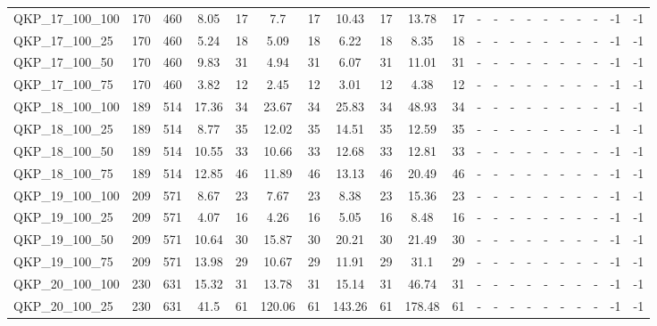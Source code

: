 \begin{sidewaystable}[!ht]
{\begin{tabular}{lcccccccccccccccccccc}
QKP\_17\_100\_100 & 170 & 460 & 8.05 & 17 &  \textcolor{blue2}{7.7} & 17 & 10.43 & 17 & 13.78 & 17 &  - &  - &  - &  - &  - &  - &  - &  - & -1 & -1 \\
QKP\_17\_100\_25 & 170 & 460 & 5.24 & 18 &  \textcolor{blue2}{5.09} & 18 & 6.22 & 18 & 8.35 & 18 &  - &  - &  - &  - &  - &  - &  - &  - & -1 & -1 \\
QKP\_17\_100\_50 & 170 & 460 & 9.83 & 31 &  \textcolor{blue2}{4.94} & 31 & 6.07 & 31 & 11.01 & 31 &  - &  - &  - &  - &  - &  - &  - &  - & -1 & -1 \\
QKP\_17\_100\_75 & 170 & 460 & 3.82 & 12 &  \textcolor{blue2}{2.45} & 12 & 3.01 & 12 & 4.38 & 12 &  - &  - &  - &  - &  - &  - &  - &  - & -1 & -1 \\
QKP\_18\_100\_100 & 189 & 514 &  \textcolor{blue2}{17.36} & 34 & 23.67 & 34 & 25.83 & 34 & 48.93 & 34 &  - &  - &  - &  - &  - &  - &  - &  - & -1 & -1 \\
QKP\_18\_100\_25 & 189 & 514 &  \textcolor{blue2}{8.77} & 35 & 12.02 & 35 & 14.51 & 35 & 12.59 & 35 &  - &  - &  - &  - &  - &  - &  - &  - & -1 & -1 \\
QKP\_18\_100\_50 & 189 & 514 &  \textcolor{blue2}{10.55} & 33 & 10.66 & 33 & 12.68 & 33 & 12.81 & 33 &  - &  - &  - &  - &  - &  - &  - &  - & -1 & -1 \\
QKP\_18\_100\_75 & 189 & 514 & 12.85 & 46 &  \textcolor{blue2}{11.89} & 46 & 13.13 & 46 & 20.49 & 46 &  - &  - &  - &  - &  - &  - &  - &  - & -1 & -1 \\
QKP\_19\_100\_100 & 209 & 571 & 8.67 & 23 &  \textcolor{blue2}{7.67} & 23 & 8.38 & 23 & 15.36 & 23 &  - &  - &  - &  - &  - &  - &  - &  - & -1 & -1 \\
QKP\_19\_100\_25 & 209 & 571 &  \textcolor{blue2}{4.07} & 16 & 4.26 & 16 & 5.05 & 16 & 8.48 & 16 &  - &  - &  - &  - &  - &  - &  - &  - & -1 & -1 \\
QKP\_19\_100\_50 & 209 & 571 &  \textcolor{blue2}{10.64} & 30 & 15.87 & 30 & 20.21 & 30 & 21.49 & 30 &  - &  - &  - &  - &  - &  - &  - &  - & -1 & -1 \\
QKP\_19\_100\_75 & 209 & 571 & 13.98 & 29 &  \textcolor{blue2}{10.67} & 29 & 11.91 & 29 & 31.1 & 29 &  - &  - &  - &  - &  - &  - &  - &  - & -1 & -1 \\
QKP\_20\_100\_100 & 230 & 631 & 15.32 & 31 &  \textcolor{blue2}{13.78} & 31 & 15.14 & 31 & 46.74 & 31 &  - &  - &  - &  - &  - &  - &  - &  - & -1 & -1 \\
QKP\_20\_100\_25 & 230 & 631 &  \textcolor{blue2}{41.5} & 61 & 120.06 & 61 & 143.26 & 61 & 178.48 & 61 &  - &  - &  - &  - &  - &  - &  - &  - & -1 & -1 \\

\end{tabular}}
\end{sidewaystable}
